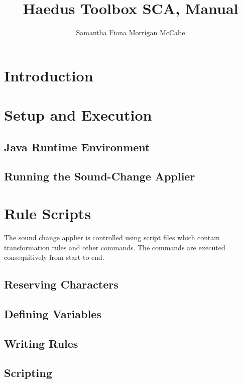 \documentclass[10pt,letterpaper]{article}
\title{Haedus Toolbox SCA, Manual}
\author{Samantha Fiona Morrígan McCabe}
\begin{document}
\maketitle

\section{Introduction}\label{sec:intro}

\section{Setup and Execution}\label{sec:setup}

\subsection{Java Runtime Environment}\label{sec:java}

\subsection{Running the Sound-Change Applier}\label{sec:running}

\section{Rule Scripts}\label{sec:scripts}
The sound change applier is controlled using script files which contain transformation rules and other commands. The commands are executed consequitively from start to end.

\subsection{Reserving Characters}\label{sec:reserving}

\subsection{Defining Variables}\label{sec:definingvariables}

\subsection{Writing Rules}\label{sec:writingrules}

\subsection{Scripting}\label{sec:scripting}
\end{document}

